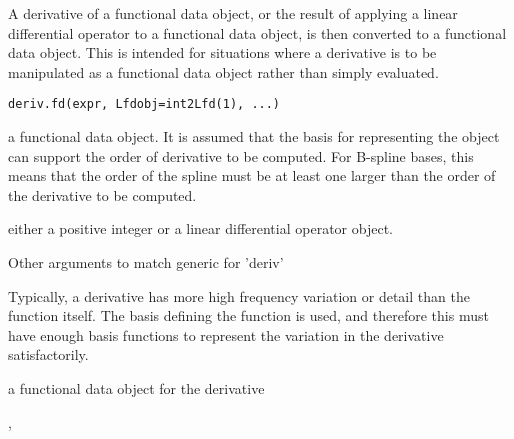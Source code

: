 \begin{Description}\relax
A derivative of a functional data object, or the result of applying
a linear differential operator to a functional data object, is then
converted to a functional data object. This is intended for situations
where a derivative is to be manipulated as a functional data object
rather than simply evaluated.
\end{Description}
\begin{Usage}
\begin{verbatim}
deriv.fd(expr, Lfdobj=int2Lfd(1), ...)
\end{verbatim}
\end{Usage}
\begin{Arguments}
\begin{ldescription}
\item[\code{expr}] a functional data object.  It is assumed that the basis for
representing the object can support the order of derivative
to be computed.  For B-spline bases, this means that the
order of the spline must be at least one larger than the order of
the derivative to be computed.

\item[\code{Lfdobj}] either a positive integer or a linear differential operator object.

\item[\code{...}] Other arguments to match generic for 'deriv'
\end{ldescription}
\end{Arguments}
\begin{Details}\relax
Typically, a derivative has more high frequency variation or detail
than the function itself.  The basis defining the function is used,
and therefore this must have enough basis functions to represent
the variation in the derivative satisfactorily.
\end{Details}
\begin{Value}
a functional data object for the derivative
\end{Value}
\begin{SeeAlso}\relax
{}, 
\end{SeeAlso}
